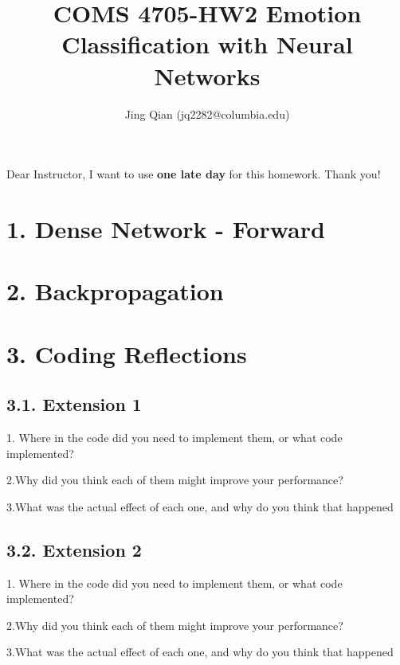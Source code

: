 \documentclass{article}
\title{COMS 4705-HW2 Emotion Classification with Neural Networks}
\author{Jing Qian (jq2282@columbia.edu)}
\begin{document}
\maketitle

Dear Instructor, I want to use \textbf{one late day} for this homework. Thank you!

\section*{1. Dense Network - Forward}



\section*{2. Backpropagation}

\section*{3. Coding Reflections}
\subsection*{3.1. Extension 1}
1. Where in the code did you need to implement them, or what code implemented?

2.Why did you think each of them might improve your performance? 

3.What was the actual effect of each one, and why do you think that happened

\subsection*{3.2. Extension 2}
1. Where in the code did you need to implement them, or what code implemented?

2.Why did you think each of them might improve your performance? 

3.What was the actual effect of each one, and why do you think that happened
\end{document}
